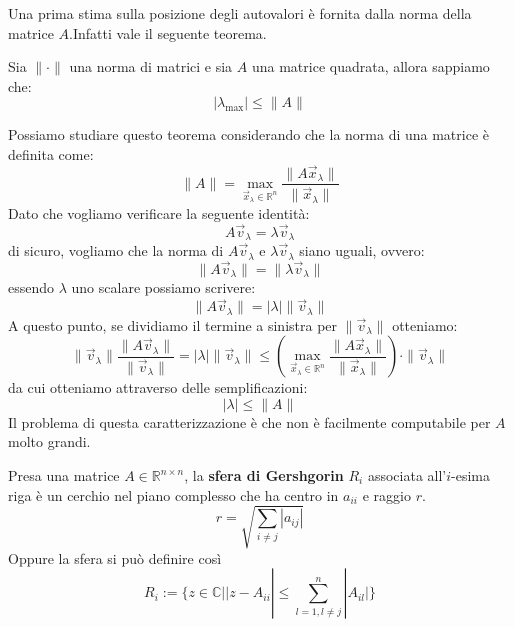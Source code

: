 Una prima stima sulla posizione degli autovalori è fornita dalla norma della
matrice $A$.Infatti vale il seguente teorema.
\begin{teorema}
    Sia $\|\cdot\|$ una norma di matrici e sia $A$ una matrice quadrata, allora
    sappiamo che:
    \begin{equation*}
        |\lambda_{\max}| \leq \|A\|
    \end{equation*}
\end{teorema}
Possiamo studiare questo teorema considerando che la norma di una matrice è
definita come:
\begin{equation*}
    \|A\| = \max_{\vec{x}_\lambda \in \mathbb{R}^n} \frac{\|A\vec{x}_\lambda\|}{\|\vec{x}_\lambda\|}
\end{equation*}
Dato che vogliamo verificare la seguente identità:
\begin{equation*}
    A\vec{v}_\lambda = \lambda \vec{v}_\lambda
\end{equation*}
di sicuro, vogliamo che la norma di $A \vec{v}_\lambda$ e $\lambda \vec{v}_\lambda$
siano uguali, ovvero:
\begin{equation*}
    \|A\vec{v}_\lambda\| = \|\lambda \vec{v}_\lambda\|
\end{equation*}
essendo $\lambda$ uno scalare possiamo scrivere:
\begin{equation*}
    \|A\vec{v}_\lambda\| = |\lambda| \|\vec{v}_\lambda\|
\end{equation*}
A questo punto, se dividiamo il termine a sinistra per $\|\vec{v}_\lambda\|$ otteniamo:
\begin{equation*}
    \|\vec{v}_\lambda\| \frac{\|A\vec{v}_\lambda\|}{\|\vec{v}_\lambda\|} = |\lambda| \|\vec{v}_\lambda\|
    \leq \left(\max_{\vec{x}_\lambda \in \mathbb{R}^n} \frac{\|A\vec{x}_\lambda\|}{\|\vec{x}_\lambda\|}\right) \cdot \|\vec{v}_\lambda\|
\end{equation*}
da cui otteniamo attraverso delle semplificazioni:
\begin{equation*}
    |\lambda| \leq \|A\|
\end{equation*}
Il problema di questa caratterizzazione è che non è facilmente computabile per
$A$ molto grandi.

\begin{definizione} 
    Presa una matrice $A\in \mathbb{R}^{n\times n}$, la \textbf{sfera di Gershgorin} $R_i$
    associata all'$i$-esima riga è un cerchio nel piano complesso che ha centro
    in $a_{ii}$ e raggio $r$.
    $$r = \sqrt{\sum_{i\ne j}|a_{ij}|}$$
    Oppure la sfera si può definire così $$R_i:=\{z\in \mathbb{C}|
        |z-A_{ii}| \leq \sum_{l=1, l\neq j}^{n} |A_{il}|\}$$
\end{definizione}

